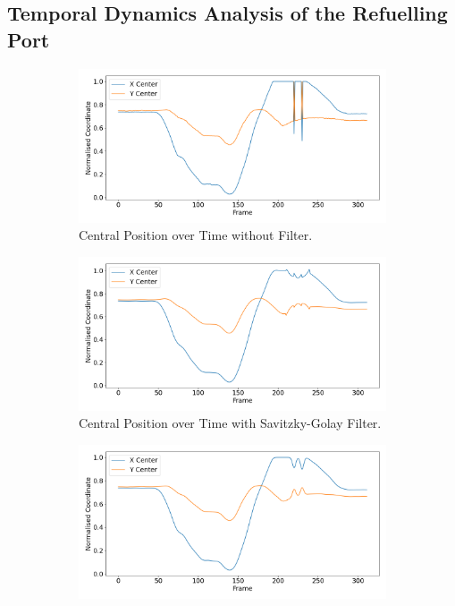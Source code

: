 \documentclass[12pt,oneside]{book} %
\begin{document}
\subsection{Temporal Dynamics Analysis of the Refuelling Port}
\begin{figure}[H]
    \centering
    \begin{subfigure}[t]{0.60\textwidth}
        \includegraphics[width=\textwidth]{figures/bbox_metrics/test_indoor1 (Raw Data)_central_position.png}
        \caption{Central Position over Time without Filter.}
        \label{fig:central-position-test-indoor1-raw}
    \end{subfigure}
    \hfill
    \begin{subfigure}[t]{0.60\textwidth}
        \includegraphics[width=\textwidth]{figures/bbox_metrics/test_indoor1 (Savgol Filter)_central_position.png}
        \caption{Central Position over Time with Savitzky-Golay Filter.}
        \label{fig:central-position-test-indoor1-savgol}
    \end{subfigure}
    \vfill
    \begin{subfigure}[t]{0.60\textwidth}
        \includegraphics[width=\textwidth]{figures/bbox_metrics/test_indoor1 (Gaussian Filter)_central_position.png}

\end{subfigure}
\end{figure}
\end{document}
